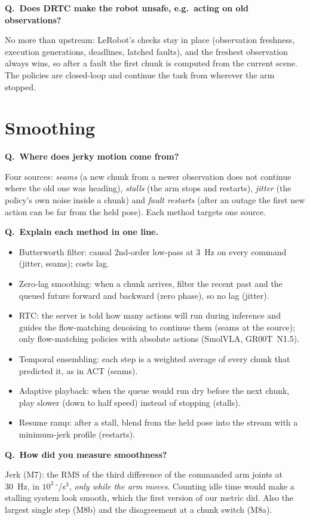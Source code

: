 \documentclass[11pt,a4paper]{article}
\newcommand{\drtc}{DRTC}
\newcommand{\smolvla}{SmolVLA}
\newcommand{\groot}{GR00T~N1.5}
\newcommand{\degree}{$^\circ$}
\newcounter{qn}
\newcommand{\q}[2]{\stepcounter{qn}\par\medskip
  {\bfseries\color{accent}Q\theqn.\ #1}\par\nopagebreak[4]#2\par}
\begin{document}
\q{Does \drtc{} make the robot unsafe, e.g.\ acting on old observations?}{No more than upstream: LeRobot's checks stay
in place (observation freshness, execution generations, deadlines, latched faults), and the freshest observation
always wins, so after a fault the first chunk is computed from the current scene. The policies are closed-loop and
continue the task from wherever the arm stopped.}

\section{Smoothing}

\q{Where does jerky motion come from?}{Four sources: \emph{seams} (a new chunk from a newer observation does not
continue where the old one was heading), \emph{stalls} (the arm stops and restarts), \emph{jitter} (the policy's own
noise inside a chunk) and \emph{fault restarts} (after an outage the first new action can be far from the held pose).
Each method targets one source.}

\q{Explain each method in one line.}{\begin{itemize}[nosep]
\item Butterworth filter: causal 2nd-order low-pass at 3~Hz on every command (jitter, seams); costs lag.
\item Zero-lag smoothing: when a chunk arrives, filter the recent past and the queued future forward and backward
  (zero phase), so no lag (jitter).
\item RTC: the server is told how many actions will run during inference and guides the flow-matching denoising to
  continue them (seams at the source); only flow-matching policies with absolute actions (\smolvla, \groot).
\item Temporal ensembling: each step is a weighted average of every chunk that predicted it, as in ACT (seams).
\item Adaptive playback: when the queue would run dry before the next chunk, play slower (down to half speed) instead
  of stopping (stalls).
\item Resume ramp: after a stall, blend from the held pose into the stream with a minimum-jerk profile (restarts).
\end{itemize}}

\q{How did you measure smoothness?}{Jerk (M7): the RMS of the third difference of the commanded arm joints at 30~Hz,
in $10^3\,$\degree/s$^3$, \emph{only while the arm moves}. Counting idle time would make a stalling system look smooth,
which the first version of our metric did. Also the largest single step (M8b) and the disagreement at a chunk switch
(M8a).}
\end{document}
